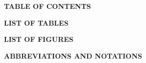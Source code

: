 \vfill


\newpage
\begin{center}
    \fontsize{14}{16}\selectfont
    \textbf{TABLE OF CONTENTS}
\end{center}
\vspace{0.5cm}
\singlespacing %

\makeatletter
{}  %
\makeatother

\newpage
\doublespacing %


\newpage
\begin{center}
    \fontsize{14}{16}\selectfont
    \textbf{LIST OF TABLES}
\end{center}
\vspace{0.5cm}
\singlespacing %

\makeatletter
{}  %
\makeatother

\newpage
\doublespacing %

\newpage
\begin{center}
    \fontsize{14}{16}\selectfont
    \textbf{LIST OF FIGURES}
\end{center}
\vspace{0.5cm}
\singlespacing %

\makeatletter
{}  %
\makeatother

\newpage
\doublespacing %


\newpage
\begin{center}
    \fontsize{14}{16}\selectfont
    \textbf{ABBREVIATIONS AND NOTATIONS}
\end{center}
\vspace{0.5cm}
\doublespacing
\justifying


